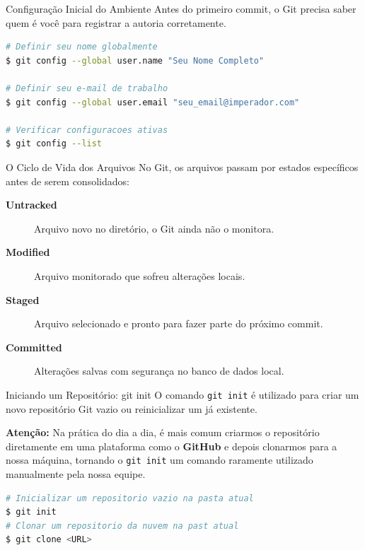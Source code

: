 \documentclass[10pt,aspectratio=169]{beamer}
\begin{document}
\begin{frame}[fragile]{Configuração Inicial do Ambiente}
    Antes do primeiro commit, o Git precisa saber quem é você para registrar a autoria corretamente.
    \vspace{0.3cm}
    \begin{lstlisting}[language=bash]
# Definir seu nome globalmente
$ git config --global user.name "Seu Nome Completo"

# Definir seu e-mail de trabalho
$ git config --global user.email "seu_email@imperador.com"

# Verificar configuracoes ativas
$ git config --list
    \end{lstlisting}
\end{frame}

\begin{frame}{O Ciclo de Vida dos Arquivos}
    No Git, os arquivos passam por estados específicos antes de serem consolidados:
    \vspace{0.3cm}
    \begin{description}
        \item[\textcolor{imperadorblue}{\textbf{Untracked}}] Arquivo novo no diretório, o Git ainda não o monitora.
        \item[\textcolor{imperadorblue}{\textbf{Modified}}] Arquivo monitorado que sofreu alterações locais.
        \item[\textcolor{imperadorblue}{\textbf{Staged}}] Arquivo selecionado e pronto para fazer parte do próximo commit.
        \item[\textcolor{imperadorblue}{\textbf{Committed}}] Alterações salvas com segurança no banco de dados local.
    \end{description}
\end{frame}

\begin{frame}[fragile]{Iniciando um Repositório: git init}
    O comando \texttt{git init} é utilizado para criar um novo repositório Git vazio ou reinicializar um já existente.
    \vspace{0.3cm}
    
    \textbf{Atenção:} Na prática do dia a dia, é mais comum criarmos o repositório diretamente em uma plataforma como o \textbf{GitHub} e depois clonarmos para a nossa máquina, tornando o \texttt{git init} um comando raramente utilizado manualmente pela nossa equipe.
    
    \vspace{0.3cm}
    \begin{lstlisting}[language=bash]
# Inicializar um repositorio vazio na pasta atual
$ git init
# Clonar um repositorio da nuvem na past atual
$ git clone <URL>
    \end{lstlisting}
\end{frame}
\end{document}
